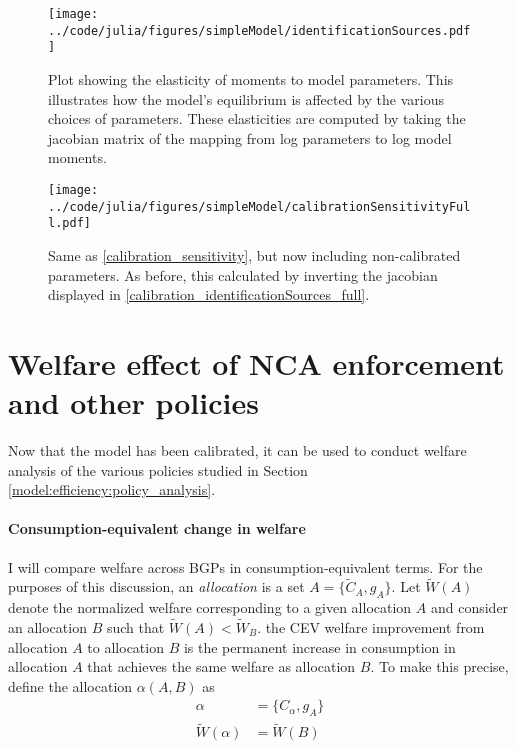\documentclass[11pt,english]{article}
\begin{document}
\begin{figure}[]
	\texttt{[image: ../code/julia/figures/simpleModel/identificationSources.pdf]}
	\caption{Plot showing the elasticity of moments to model parameters. This illustrates how the model's equilibrium is affected by the various choices of parameters. These elasticities are computed by taking the jacobian matrix of the mapping from log parameters to log model moments.}
	\label{calibration_identificationSources}
\end{figure}

\begin{figure}[]
	\texttt{[image: ../code/julia/figures/simpleModel/calibrationSensitivityFull.pdf]}
	\caption{Same as \autoref{calibration_sensitivity}, but now including non-calibrated parameters. As before, this calculated by inverting the jacobian displayed in \autoref{calibration_identificationSources_full}.}
	\label{calibration_sensitivity_full}
\end{figure}

\section{Welfare effect of NCA enforcement and other policies}\label{sec:policy_analysis}

Now that the model has been calibrated, it can be used to conduct welfare analysis of the various policies studied in Section \ref{model:efficiency:policy_analysis}.

\paragraph{Consumption-equivalent change in welfare} 

I will compare welfare across BGPs in consumption-equivalent terms. For the purposes of this discussion, an \textit{allocation} is a set $A = \{ \tilde{C}_A, g_A \}$. Let $\tilde{W}(A)$ denote the normalized welfare corresponding to a given allocation $A$ and consider an allocation $B$ such that $\tilde{W}(A) < \tilde{W}_B$. the CEV welfare improvement from allocation $A$ to allocation $B$ is the permanent increase in consumption in allocation $A$ that achieves the same welfare as allocation $B$. To make this precise, define the allocation $\alpha(A,B)$ as
\begin{align}
\alpha &= \{C_{\alpha}, g_A\} \\
\tilde{W} ( \alpha ) &= \tilde{W} ( B ) 
\end{align}
\end{document}
